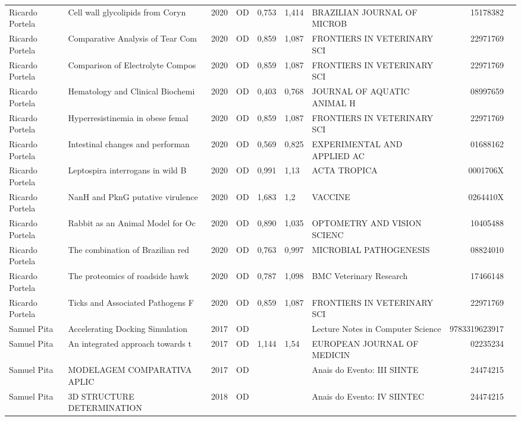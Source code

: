 \documentclass[12pt,brazil]{article}\usepackage[]{graphicx}\usepackage[]{xcolor}
\begin{document}
\begin{longtable}{lllrrllrr}
Ricardo Portela & Cell wall glycolipids from Coryn & 2020 & OD & 0,753 & 1,414 & BRAZILIAN JOURNAL OF MICROB & 15178382 \\
Ricardo Portela & Comparative Analysis of Tear Com & 2020 & OD & 0,859 & 1,087 & FRONTIERS IN VETERINARY SCI & 22971769 \\
Ricardo Portela & Comparison of Electrolyte Compos & 2020 & OD & 0,859 & 1,087 & FRONTIERS IN VETERINARY SCI & 22971769 \\
Ricardo Portela & Hematology and Clinical Biochemi & 2020 & OD & 0,403 & 0,768 & JOURNAL OF AQUATIC ANIMAL H & 08997659 \\
Ricardo Portela & Hyperresistinemia in obese femal & 2020 & OD & 0,859 & 1,087 & FRONTIERS IN VETERINARY SCI & 22971769 \\
Ricardo Portela & Intestinal changes and performan & 2020 & OD & 0,569 & 0,825 & EXPERIMENTAL AND APPLIED AC & 01688162 \\
Ricardo Portela & Leptospira interrogans in wild B & 2020 & OD & 0,991 & 1,13 & ACTA TROPICA & 0001706X \\
Ricardo Portela & NanH and PknG putative virulence & 2020 & OD & 1,683 & 1,2 & VACCINE & 0264410X \\
Ricardo Portela & Rabbit as an Animal Model for Oc & 2020 & OD & 0,890 & 1,035 & OPTOMETRY AND VISION SCIENC & 10405488 \\
Ricardo Portela & The combination of Brazilian red & 2020 & OD & 0,763 & 0,997 & MICROBIAL PATHOGENESIS & 08824010 \\
Ricardo Portela & The proteomics of roadside hawk  & 2020 & OD & 0,787 & 1,098 & BMC Veterinary Research & 17466148 \\
Ricardo Portela & Ticks and Associated Pathogens F & 2020 & OD & 0,859 & 1,087 & FRONTIERS IN VETERINARY SCI & 22971769 \\
Samuel Pita & Accelerating Docking Simulation  & 2017 & OD &  &  & Lecture Notes in Computer Science & 9783319623917 \\
Samuel Pita & An integrated approach towards t & 2017 & OD & 1,144 & 1,54 & EUROPEAN JOURNAL OF MEDICIN & 02235234 \\
Samuel Pita & MODELAGEM COMPARATIVA APLIC & 2017 & OD &  &  & Anais do Evento: III SIINTE & 24474215 \\
\rowcolor{coautr}\rowcolor{coautr}\rowcolor{coautr}\rowcolor{coautr}\rowcolor{coautr}\rowcolor{coautr}\rowcolor{coautr}\rowcolor{coautr}\rowcolor{coautr}\rowcolor{coautr}\rowcolor{coautr}\rowcolor{coautr}\rowcolor{coautr}\rowcolor{coautr}\rowcolor{coautr}\rowcolor{coautr}Samuel Pita & 3D STRUCTURE DETERMINATION  & 2018 & OD &  &  & Anais do Evento: IV SIINTEC & 24474215 \\

\end{longtable}
\end{document}
